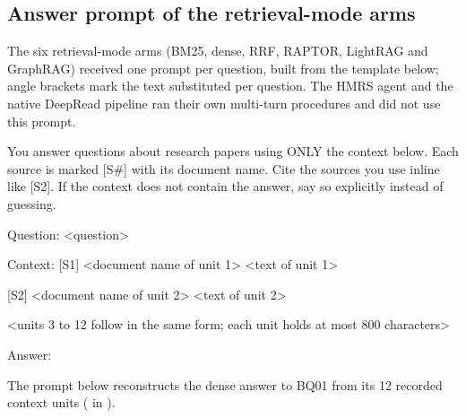 \documentclass[10pt]{article}
\begin{document}
\subsection*{Answer prompt of the retrieval-mode arms}
The six retrieval-mode arms (BM25, dense, RRF, RAPTOR, LightRAG and GraphRAG) received one prompt per question, built from the template below; angle brackets mark the text substituted per question. The HMRS agent and the native DeepRead pipeline ran their own multi-turn procedures and did not use this prompt.
\begin{EvidenceText}
You answer questions about research papers using ONLY the context below. Each source is marked [S#] with its document name. Cite the sources you use inline like [S2]. If the context does not contain the answer, say so explicitly instead of guessing.

Question: <question>

Context:
[S1] <document name of unit 1>
<text of unit 1>

[S2] <document name of unit 2>
<text of unit 2>

<units 3 to 12 follow in the same form; each unit holds at most 800 characters>

Answer:
\end{EvidenceText}
The prompt below reconstructs the dense answer to BQ01 from its 12 recorded context units ( in ).
\end{document}

